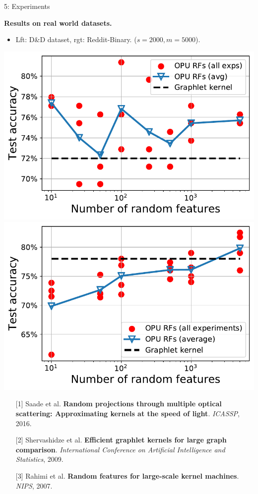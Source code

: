 \documentclass[final,dvipsnames]{beamer}
\newcommand{\vsp}{\vspace{10pt}}
\begin{document}
\begin{frame}{}
\begin{columns}[t]
\begin{column}{0.29\linewidth}
\begin{myalertblock}{5: Experiments}
\hspace*{.0\linewidth}\begin{minipage}{.99\linewidth}
\begin{mynotablock}{\textbf{Results on real world datasets.}}
	\small 
	\begin{itemize}
		\item Lft: D\&D dataset, rgt: Reddit-Binary. ($s=2000, m = 5000$).
	\end{itemize}
	\vsp
	 \includegraphics[width=0.45\linewidth]{figs/DD.pdf}\hfill
	\includegraphics[width=0.45\linewidth]{figs/Reddit.pdf}

\end{mynotablock}
\end{minipage}
\end{myalertblock}


 {\footnotesize
   \begin{itemize}
   \item[{[1]}]Saade et al. \textbf{Random projections through multiple optical scattering: Approximating kernels at the speed of light}. \emph{ICASSP}, 2016.
   \item[{[2]}] Shervashidze et al. \textbf{Efficient graphlet kernels for large graph comparison}. \emph{International Conference on Artificial Intelligence and Statistics}, 2009.
    \item[{[3]}] Rahimi et al. \textbf{Random features for large-scale kernel machines}. \emph{NIPS}, 2007.

	
\end{itemize}
 }



\end{column}
\end{columns}




\end{frame}
\end{document}
